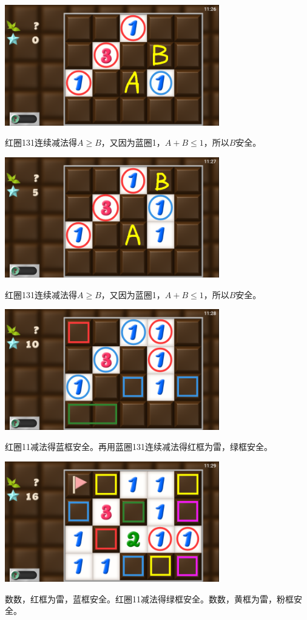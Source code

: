 \subsection{} %
\begin{center}
    \includegraphics[width=0.7\textwidth]{puzzle/165-1.png}
\end{center}
红圈131连续减法得$A\ge B$，又因为蓝圈1，$A+B\le 1$，所以$B$安全。
\begin{center}
    \includegraphics[width=0.7\textwidth]{puzzle/165-2.png}
\end{center}
红圈131连续减法得$A\ge B$，又因为蓝圈1，$A+B\le 1$，所以$B$安全。
\begin{center}
    \includegraphics[width=0.7\textwidth]{puzzle/165-3.png}
\end{center}
红圈11减法得蓝框安全。再用蓝圈131连续减法得红框为雷，绿框安全。
\begin{center}
    \includegraphics[width=0.7\textwidth]{puzzle/165-4.png}
\end{center}
数数，红框为雷，蓝框安全。红圈11减法得绿框安全。数数，黄框为雷，粉框安全。

